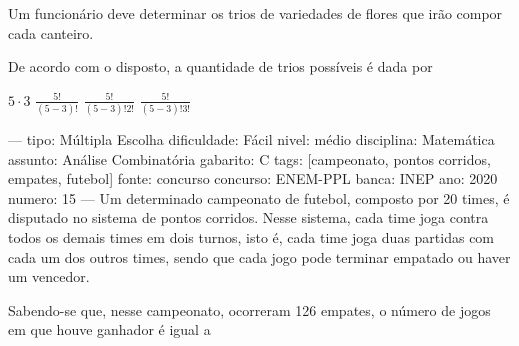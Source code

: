 Um funcionário deve determinar os trios de variedades de flores que irão compor cada canteiro.

De acordo com o disposto, a quantidade de trios possíveis é dada por
\begin{oneparchoices}
\choice \( 5 \cdot 3 \)
\choice \( \frac{5!}{(5-3)!} \)
\choice \( \frac{5!}{(5-3)!2!} \)
\correctchoice \( \frac{5!}{(5-3)!3!} \)
\end{oneparchoices}

---
tipo: Múltipla Escolha
dificuldade: Fácil
nivel: médio
disciplina: Matemática
assunto: Análise Combinatória
gabarito: C
tags: [campeonato, pontos corridos, empates, futebol]
fonte: concurso
concurso: ENEM-PPL
banca: INEP
ano: 2020
numero: 15
---
\question
Um determinado campeonato de futebol, composto por 20 times, é disputado no sistema de pontos corridos. Nesse sistema, cada time joga contra todos os demais times em dois turnos, isto é, cada time joga duas partidas com cada um dos outros times, sendo que cada jogo pode terminar empatado ou haver um vencedor.

Sabendo-se que, nesse campeonato, ocorreram 126 empates, o número de jogos em que houve ganhador é igual a
\begin{oneparchoices}
\end{oneparchoices}
